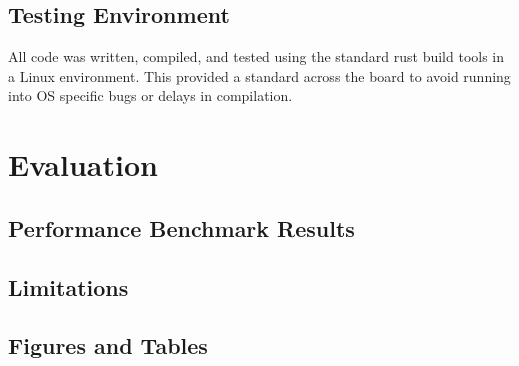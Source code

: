 \documentclass[conference]{IEEEtran}
\begin{document}

\subsection{Testing Environment}

All code was written, compiled, and tested using the standard rust build tools in a Linux environment. This provided a standard across the board to avoid running into OS specific bugs or delays in compilation. 



    

\section{Evaluation}

    \subsection{Performance Benchmark Results}
    
    \subsection{Limitations}

\subsection{Figures and Tables}





\end{document}
